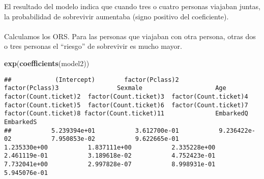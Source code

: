 \documentclass[
]{article}
\newenvironment{Shaded}{\begin{snugshade}}{\end{snugshade}}
\newcommand{\CommentTok}[1]{\textcolor[rgb]{0.56,0.35,0.01}{\textit{#1}}}
\newcommand{\DataTypeTok}[1]{\textcolor[rgb]{0.13,0.29,0.53}{#1}}
\newcommand{\DecValTok}[1]{\textcolor[rgb]{0.00,0.00,0.81}{#1}}
\newcommand{\FloatTok}[1]{\textcolor[rgb]{0.00,0.00,0.81}{#1}}
\newcommand{\KeywordTok}[1]{\textcolor[rgb]{0.13,0.29,0.53}{\textbf{#1}}}
\newcommand{\NormalTok}[1]{#1}
\newcommand{\OperatorTok}[1]{\textcolor[rgb]{0.81,0.36,0.00}{\textbf{#1}}}
\newcommand{\StringTok}[1]{\textcolor[rgb]{0.31,0.60,0.02}{#1}}
\begin{document}
\texttt{}

El resultado del modelo indica que cuando tres o cuatro personas
viajaban juntas, la probabilidad de sobrevivir aumentaba (signo positivo
del coeficiente).\\
\texttt{}~\\
Calculamos los ORS. Para las personas que viajaban con otra persona,
otras dos o tres personas el ``riesgo'' de sobrevivir es mucho mayor.

\texttt{}

\begin{Shaded}
\begin{Highlighting}[]
\KeywordTok{exp}\NormalTok{(}\KeywordTok{coefficients}\NormalTok{(model2))}
\end{Highlighting}
\end{Shaded}

\begin{verbatim}
##            (Intercept)        factor(Pclass)2        factor(Pclass)3                Sexmale                    Age  factor(Count.ticket)2  factor(Count.ticket)3  factor(Count.ticket)4  factor(Count.ticket)5  factor(Count.ticket)6  factor(Count.ticket)7  factor(Count.ticket)8 factor(Count.ticket)11              EmbarkedQ              EmbarkedS 
##           5.239394e+01           3.612700e-01           9.236422e-02           7.950853e-02           9.622665e-01           1.235330e+00           1.837111e+00           2.335228e+00           2.461119e-01           3.189618e-02           4.752423e-01           7.732041e+00           2.997828e-07           8.998931e-01           5.945076e-01
\end{verbatim}

\texttt{}\\
\texttt{}

\begin{Shaded}
\end{Shaded}
\end{document}
